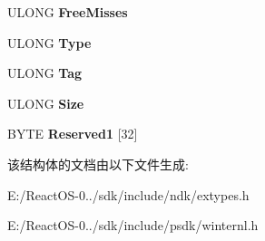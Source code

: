 \begin{DoxyCompactItemize}
U\+L\+O\+NG {\bfseries Free\+Misses}
\item 
\mbox{\label{struct___s_y_s_t_e_m___l_o_o_k_a_s_i_d_e___i_n_f_o_r_m_a_t_i_o_n_a3faa1dab246fbdb522bbd7f83ef107c3}} 
U\+L\+O\+NG {\bfseries Type}
\item 
\mbox{\label{struct___s_y_s_t_e_m___l_o_o_k_a_s_i_d_e___i_n_f_o_r_m_a_t_i_o_n_a5426a2a1602bd2dc852996252865a2f8}} 
U\+L\+O\+NG {\bfseries Tag}
\item 
\mbox{\label{struct___s_y_s_t_e_m___l_o_o_k_a_s_i_d_e___i_n_f_o_r_m_a_t_i_o_n_a291927caef4d031060d1173bd0111b1e}} 
U\+L\+O\+NG {\bfseries Size}
\item 
\mbox{\label{struct___s_y_s_t_e_m___l_o_o_k_a_s_i_d_e___i_n_f_o_r_m_a_t_i_o_n_aa25146349ce7833a7d29a9a40e43d6e0}} 
B\+Y\+TE {\bfseries Reserved1} \mbox{[}32\mbox{]}
\end{DoxyCompactItemize}


该结构体的文档由以下文件生成\+:\begin{DoxyCompactItemize}
\item 
E\+:/\+React\+O\+S-\/0../sdk/include/ndk/extypes.\+h\item 
E\+:/\+React\+O\+S-\/0../sdk/include/psdk/winternl.\+h\end{DoxyCompactItemize}
